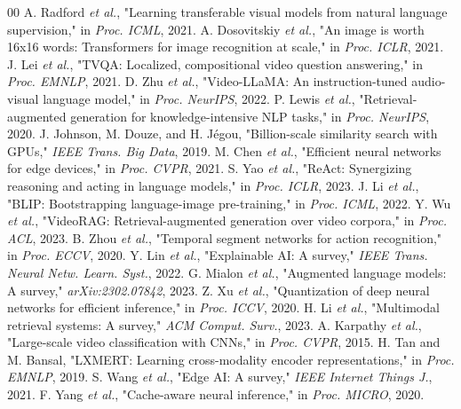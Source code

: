 \documentclass[conference,twocolumn]{IEEEtran}
\begin{document}
\begin{thebibliography}{00}
 A. Radford \textit{et al.}, "Learning transferable visual models from natural language supervision," in \textit{Proc. ICML}, 2021.
 A. Dosovitskiy \textit{et al.}, "An image is worth 16x16 words: Transformers for image recognition at scale," in \textit{Proc. ICLR}, 2021.
 J. Lei \textit{et al.}, "TVQA: Localized, compositional video question answering," in \textit{Proc. EMNLP}, 2021.
 D. Zhu \textit{et al.}, "Video-LLaMA: An instruction-tuned audio-visual language model," in \textit{Proc. NeurIPS}, 2022.
 P. Lewis \textit{et al.}, "Retrieval-augmented generation for knowledge-intensive NLP tasks," in \textit{Proc. NeurIPS}, 2020.
 J. Johnson, M. Douze, and H. J\'{e}gou, "Billion-scale similarity search with GPUs," \textit{IEEE Trans. Big Data}, 2019.
 M. Chen \textit{et al.}, "Efficient neural networks for edge devices," in \textit{Proc. CVPR}, 2021.
 S. Yao \textit{et al.}, "ReAct: Synergizing reasoning and acting in language models," in \textit{Proc. ICLR}, 2023.
 J. Li \textit{et al.}, "BLIP: Bootstrapping language-image pre-training," in \textit{Proc. ICML}, 2022.
 Y. Wu \textit{et al.}, "VideoRAG: Retrieval-augmented generation over video corpora," in \textit{Proc. ACL}, 2023.
 B. Zhou \textit{et al.}, "Temporal segment networks for action recognition," in \textit{Proc. ECCV}, 2020.
 Y. Lin \textit{et al.}, "Explainable AI: A survey," \textit{IEEE Trans. Neural Netw. Learn. Syst.}, 2022.
 G. Mialon \textit{et al.}, "Augmented language models: A survey," \textit{arXiv:2302.07842}, 2023.
 Z. Xu \textit{et al.}, "Quantization of deep neural networks for efficient inference," in \textit{Proc. ICCV}, 2020.
 H. Li \textit{et al.}, "Multimodal retrieval systems: A survey," \textit{ACM Comput. Surv.}, 2023.
 A. Karpathy \textit{et al.}, "Large-scale video classification with CNNs," in \textit{Proc. CVPR}, 2015.
 H. Tan and M. Bansal, "LXMERT: Learning cross-modality encoder representations," in \textit{Proc. EMNLP}, 2019.
 S. Wang \textit{et al.}, "Edge AI: A survey," \textit{IEEE Internet Things J.}, 2021.
 F. Yang \textit{et al.}, "Cache-aware neural inference," in \textit{Proc. MICRO}, 2020.

\end{thebibliography}
\end{document}
